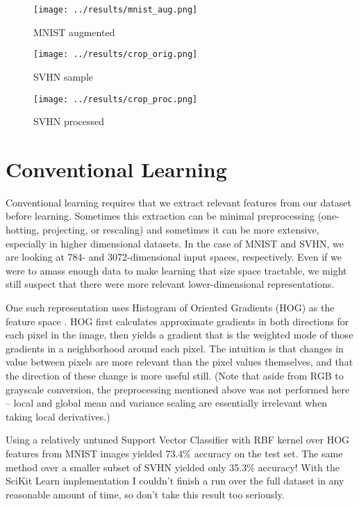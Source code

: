 \documentclass{article}
\begin{document}
\begin{figure}[htbp]
  \centering
  \texttt{[image: ../results/mnist\_aug.png]}
  \caption{MNIST augmented}
  \label{fig:mnist_aug}
\end{figure}

\begin{figure}[htbp]
  \centering
  \texttt{[image: ../results/crop\_orig.png]}
  \caption{SVHN sample}
  \label{fig:crop_orig}
\end{figure}

\begin{figure}[htbp]
  \centering
  \texttt{[image: ../results/crop\_proc.png]}
  \caption{SVHN processed}
  \label{fig:crop_proc}
\end{figure}

\section{Conventional Learning}

Conventional learning requires that we extract relevant features from our dataset before learning. Sometimes this extraction can be minimal preprocessing (one-hotting, projecting, or rescaling) and sometimes it can be more extensive, especially in higher dimensional datasets. In the case of MNIST and SVHN, we are looking at 784- and 3072-dimensional input spaces, respectively. Even if we were to amass enough data to make learning that size space tractable, we might still suspect that there were more relevant lower-dimensional representations.

One such representation uses Histogram of Oriented Gradients (HOG) as the feature space \cite{netzer2011reading}.  HOG first calculates approximate gradients in both directions for each pixel in the image, then yields a gradient that is the weighted mode of those gradients in a neighborhood around each pixel. The intuition is that changes in value between pixels are more relevant than the pixel values themselves, and that the direction of these change is more useful still.  (Note that aside from RGB to grayscale conversion, the preprocessing mentioned above was not performed here -- local and global mean and variance scaling are essentially irrelevant when taking local derivatives.)

Using a relatively untuned Support Vector Classifier with RBF kernel over HOG features from MNIST images yielded 73.4\% accuracy on the test set. The same method over a smaller subset of SVHN yielded only 35.3\% accuracy! With the SciKit Learn implementation I couldn't finish a run over the full dataset in any reasonable amount of time, so don't take this result too seriously.
\end{document}
